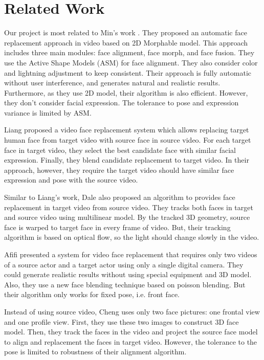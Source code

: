 \documentclass[10pt,letterpaper]{article}
\begin{document}
 
 \section{Related Work}


Our project is most related to Min's work \cite{min2010automatic}. They proposed an automatic face
replacement approach in video based on 2D Morphable model. This approach includes three main modules: face alignment, face morph, and face fusion. They use the Active Shape Models (ASM) for face alignment. They also consider color and lightning adjustment to keep consistent. Their approach is fully automatic without user interference, and generates natural and realistic results. Furthermore, as they use 2D model, their algorithm is also efficient. However, they don't consider facial expression. The tolerance to pose and expression variance is limited by ASM.

Liang \cite{liang2009image} proposed a video face replacement system which allows replacing target human face from
target video with source face in source video. For each target face in target video, they select the best candidate face with similar facial expression. Finally, they blend candidate replacement to target video. In their approach, however, they require the target video should have similar face expression and pose with the source video. 

Similar to Liang's work, Dale \cite{dale2011video} also proposed an algorithm to provides face replacement in target video from source video. They tracks both faces in target and source video using multilinear model. By the tracked 3D geometry, source face is warped to target face in every frame of video. But, their tracking algorithm is based on optical flow, so the light should change slowly in the video.

Afifi \cite{afifi2014video} presented a system for video face replacement that requires only two videos of a source actor and a target actor using only a single digital camera. They could generate realistic results without using special equipment and 3D model. Also, they use a new face blending technique based on poisson blending. But their algorithm only works for fixed pose, i.e. front face.

Instead of using source video, Cheng \cite{cheng20093d} uses only two face pictures: one frontal view and one profile view. First, they use these two images to construct 3D face model. Then, they track the faces in the video and project the source face model to align and replacement the faces in target video. However, the tolerance to the pose is limited to robustness of their alignment algorithm.
\end{document}
